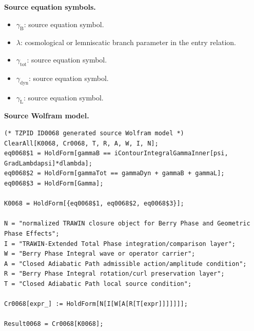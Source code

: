 \begin{minipage}[t]{0.49\linewidth}
\begingroup
\small
\raggedright
\textbf{Source equation symbols.}\par
\begin{itemize}[leftmargin=1.35em,itemsep=1pt,topsep=1pt,parsep=0pt]
    \item $\gamma_{\mathrm{B}}$: source equation symbol.
    \item $\lambda$: cosmological or lemniscatic branch parameter in the entry relation.
    \item $\gamma_{\mathrm{tot}}$: source equation symbol.
    \item $\gamma_{\mathrm{dyn}}$: source equation symbol.
    \item $\gamma_{\mathrm{L}}$: source equation symbol.
\end{itemize}
\endgroup
\end{minipage}\hfill
\begin{minipage}[t]{0.47\linewidth}
\begingroup
\scriptsize
\raggedright
\textbf{Source Wolfram model.}\par
\begin{Verbatim}[fontsize=\tiny,breaklines=true,breakanywhere=true]
(* TZPID ID0068 generated source Wolfram model *)
ClearAll[K0068, Cr0068, T, R, A, W, I, N];
eq0068$1 = HoldForm[gammaB == iContourIntegralGammaInner[psi, GradLambdapsi]*dlambda];
eq0068$2 = HoldForm[gammaTot == gammaDyn + gammaB + gammaL];
eq0068$3 = HoldForm[Gamma];

K0068 = HoldForm[{eq0068$1, eq0068$2, eq0068$3}];

N = "normalized TRAWIN closure object for Berry Phase and Geometric Phase Effects";
I = "TRAWIN-Extended Total Phase integration/comparison layer";
W = "Berry Phase Integral wave or operator carrier";
A = "Closed Adiabatic Path admissible action/amplitude condition";
R = "Berry Phase Integral rotation/curl preservation layer";
T = "Closed Adiabatic Path local source condition";

Cr0068[expr_] := HoldForm[N[I[W[A[R[T[expr]]]]]]];

Result0068 = Cr0068[K0068];
\end{Verbatim}
\endgroup
\end{minipage}

